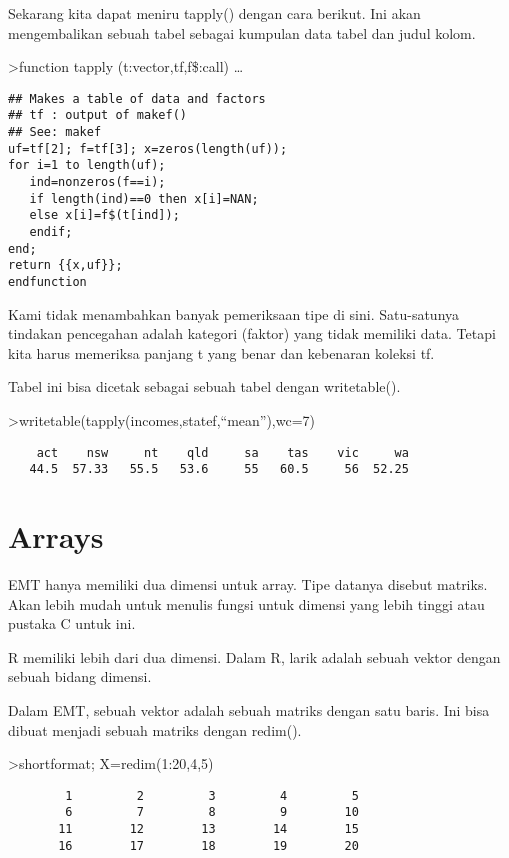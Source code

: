 \documentclass[
]{book}
\begin{document}
Sekarang kita dapat meniru tapply() dengan cara berikut. Ini akan mengembalikan sebuah tabel sebagai kumpulan data tabel dan judul kolom.

\textgreater function tapply (t:vector,tf,f\$:call) \ldots{}

\begin{verbatim}
## Makes a table of data and factors
## tf : output of makef()
## See: makef
uf=tf[2]; f=tf[3]; x=zeros(length(uf));
for i=1 to length(uf);
   ind=nonzeros(f==i);
   if length(ind)==0 then x[i]=NAN;
   else x[i]=f$(t[ind]);
   endif;
end;
return {{x,uf}};
endfunction
\end{verbatim}

Kami tidak menambahkan banyak pemeriksaan tipe di sini. Satu-satunya tindakan pencegahan adalah kategori (faktor) yang tidak memiliki data. Tetapi kita harus memeriksa panjang t yang benar dan kebenaran koleksi tf.

Tabel ini bisa dicetak sebagai sebuah tabel dengan writetable().

\textgreater writetable(tapply(incomes,statef,``mean''),wc=7)

\begin{verbatim}
    act    nsw     nt    qld     sa    tas    vic     wa
   44.5  57.33   55.5   53.6     55   60.5     56  52.25
\end{verbatim}

\section{Arrays}\label{arrays}

EMT hanya memiliki dua dimensi untuk array. Tipe datanya disebut matriks. Akan lebih mudah untuk menulis fungsi untuk dimensi yang lebih tinggi atau pustaka C untuk ini.

R memiliki lebih dari dua dimensi. Dalam R, larik adalah sebuah vektor dengan sebuah bidang dimensi.

Dalam EMT, sebuah vektor adalah sebuah matriks dengan satu baris. Ini bisa dibuat menjadi sebuah matriks dengan redim().

\textgreater shortformat; X=redim(1:20,4,5)

\begin{verbatim}
        1         2         3         4         5 
        6         7         8         9        10 
       11        12        13        14        15 
       16        17        18        19        20 
\end{verbatim}
\end{document}
